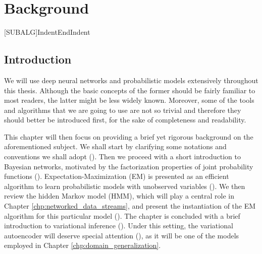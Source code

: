 
\chapter{Background}


\label{chp:background}


[SUBALG]{Indent}{EndIndent}{}{\algorithmicend\ }%

\section{Introduction}
\label{sec:background_intro}
We will use deep neural networks and probabilistic models extensively throughout this thesis. Although the basic concepts of the former should be fairly familiar to most readers, the latter might be less widely known. Moreover, some of the tools and algorithms that we are going to use are not so trivial and therefore they should better be introduced first, for the sake of completeness and readability.

This chapter will then focus on providing a brief yet rigorous background on the aforementioned subject. We shall start by clarifying some notations and conventions we shall adopt (). Then we proceed with a short introduction to Bayesian networks, motivated by the factorization properties of joint probability functions (\Secref{}). Expectation-Maximization (EM) is presented as an efficient algorithm to learn probabilistic models with unobserved variables (\Secref{}). We then review the hidden Markov model (HMM), which will play a central role in Chapter \ref{chp:networked_data_streams}, and present the instantiation of the EM algorithm for this particular model (\Secref{}). The chapter is concluded with a brief introduction to variational inference (\Secref{}). Under this setting, the variational autoencoder will deserve special attention (\Secref{}), as it will be one of the models employed in Chapter \ref{chp:domain_generalization}.


